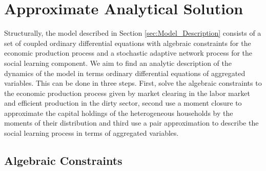 \section{Approximate Analytical Solution}

Structurally, the model described in Section \ref{sec:Model_Description} consists of a set of coupled ordinary differential equations with algebraic constraints for the economic production process and a stochastic adaptive network process for the social learning component.
We aim to find an analytic description of the dynamics of the model in terms ordinary differential equations of aggregated variables. This can be done in three steps. First, solve the algebraic constraints to the economic production process given by market clearing in the labor market and efficient production in the dirty sector, second use a moment closure to approximate the capital holdings of the heterogeneous households by the moments of their distribution and third use a pair approximation to describe the social learning process in terms of aggregated variables.

\subsection{Algebraic Constraints}

